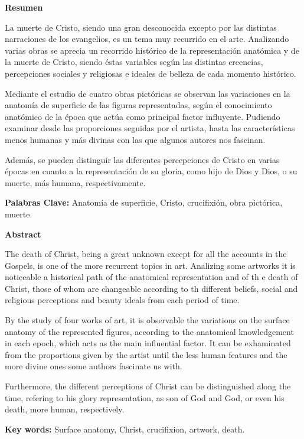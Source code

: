 \textbf{Resumen}

La muerte de Cristo, siendo una gran desconocida excepto por las distintas narraciones de los evangelios, es un tema muy recurrido en el arte. Analizando varias obras se aprecia un recorrido histórico de la representación anatómica y de la muerte de Cristo, siendo éstas variables según las distintas creencias, percepciones sociales y religiosas e ideales de belleza de cada momento histórico.

Mediante el estudio de cuatro obras pictóricas se observan las variaciones en la anatomía de superficie de las figuras representadas, según el conocimiento anatómico de la época que actúa como principal factor influyente. Pudiendo examinar desde las proporciones seguidas por el artista, hasta las características menos humanas y más divinas con las que algunos autores nos fascinan.

Además, se pueden distinguir las diferentes percepciones de Cristo en varias épocas en cuanto a la representación de su gloria, como hijo de Dios y Dios, o su muerte, más humana, respectivamente.

\vspace{15pt}

\textbf{Palabras Clave:}
Anatomía de superficie, Cristo, crucifixión, obra pictórica, muerte.

\vspace{30pt}

\textbf{Abstract}

The death of Christ, being a great unknown except for all the accounts in the Gospels, is one of the more recurrent topics in art. Analizing some artworks it is noticeable a historical path of the anatomical representation and of th e death of Christ, those of whom are changeable according to th different beliefs, social and religious perceptions and beauty ideals from each period of time.

By the study of four works of art, it is observable the variations on the surface anatomy of the represented figures, according to the anatomical knowledgement in each epoch, which acts as the main influential factor. It can be exhaminated from the proportions given by the artist until the less human features and the more divine ones some authors fascinate us with.

Furthermore, the different perceptions of Christ can be distinguished  along the time, refering to his glory representation, as son of God and God, or even his death, more human, respectively.

\vspace{15pt}

\textbf{Key words:}
Surface anatomy, Christ, crucifixion, artwork, death.